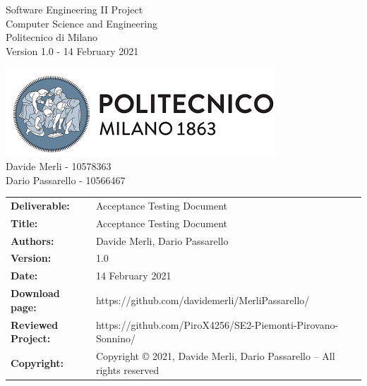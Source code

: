 \begin{titlepage}
\begin{center}
    \begin{multicols}{2}
      \large
      \begin{flushleft}
        Software Engineering II Project \\
        Computer Science and Engineering\\
        Politecnico di Milano\\
        Version 1.0 - 14 February 2021 \\
      \end{flushleft}
      \begin{flushright}
        \includegraphics[scale=0.6]{Images/PolimiLogo.png} \\
        Davide Merli - 10578363\\
        Dario Passarello - 10566467 \\
      \end{flushright}
    \end{multicols}

  \end{center}

\end{titlepage}

\begin{table}[h!]
  \begin{tabu} to \textwidth { X[0.4,r,p] X[0.7,l,p] }
    \hline

    \textbf{Deliverable:}   & Acceptance Testing Document                                            \\
    \textbf{Title:}         & Acceptance Testing Document                                            \\
    \textbf{Authors:}       & Davide Merli, Dario Passarello                                         \\
    \textbf{Version:}       & 1.0                                                                    \\
    \textbf{Date:}          & 14 February 2021                                                       \\
    \textbf{Download page:} & https://github.com/davidemerli/MerliPassarello/      \\
    \textbf{Reviewed Project:} & https://github.com/PiroX4256/SE2-Piemonti-Pirovano-Sonnino/                       \\
    \textbf{Copyright:}     & Copyright © 2021, Davide Merli, Dario Passarello – All rights reserved \\
    \hline
  \end{tabu}
\end{table}




